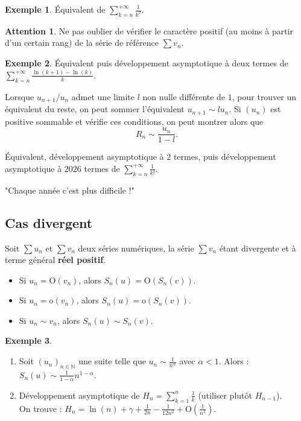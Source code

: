 \documentclass[french]{article}
\newcommand{\N}{\mathbb{N}}
\renewcommand{\o}{\text{o}}
\renewcommand{\O}{\text{O}}
\theoremstyle{plain}
\theoremstyle{definition}
\newtheorem*{ex}{Exemple}
\newtheorem*{attention}{Attention}
\theoremstyle{remark}
\begin{document}
\begin{ex}
	Équivalent de $\displaystyle\sum_{k=n}^{+\infty}\frac{1}{k^2}$.
\end{ex}

\begin{attention}
	Ne pas oublier de vérifier le caractère positif (au moins à partir d'un certain rang) de la série de référence $\displaystyle\sum v_n$.
\end{attention}

\begin{ex}
	Équivalent puis développement asymptotique à deux termes de $\displaystyle\sum_{k=n}^{+\infty}\frac{\ln(k+1)-\ln(k)}{k}$.
\end{ex}

\begin{met}
	Lorsque $u_{n+1}/u_n$ admet une limite $l$ non nulle différente de $1$, pour trouver un équivalent du reste, on peut sommer l'équivalent $u_{n+1}\sim lu_n$. Si $(u_n)$ est positive sommable et vérifie ces conditions, on peut montrer alors que $$R_n\sim\frac{u_n}{1-l}.$$
\end{met}

\begin{exo}
	Équivalent, développement asymptotique à $2$ termes, puis développement asymptotique à $2026$ termes de $\displaystyle\sum_{k=n}^{+\infty}\frac{1}{k!}$.
\end{exo}

"Chaque année c'est plus difficile !"

\subsection{Cas divergent}

\begin{thm}
	Soit $\displaystyle\sum u_n$ et $\displaystyle\sum v_n$ deux séries numériques, la série $\displaystyle \sum v_n$ étant divergente et à terme général \textbf{réel positif}.
	\begin{itemize}
		\item Si $u_n=\O(v_n)$, alors $S_n(u)=\O(S_n(v))$.
		\item Si $u_n=\o(v_n)$, alors $S_n(u)=\o(S_n(v))$.
		\item Si $u_n\sim v_n$, alors $S_n(u)\sim S_n(v)$.
	\end{itemize}
\end{thm}

\begin{ex}
	\begin{enumerate}
		\item Soit $(u_n)_{n\in\N}$ une suite telle que $u_n\sim\displaystyle\frac{1}{n^\alpha}$ avec $\alpha<1$. Alors : $S_n(u)\sim\displaystyle\frac{1}{1-\alpha}n^{1-\alpha}$.
		\item Développement asymptotique de $H_n=\displaystyle\sum_{k=1}^{n}\frac{1}{k}$ (utiliser plutôt $H_{n-1}$). \\
		On trouve : $H_n=\displaystyle\ln(n)+\gamma+\frac{1}{2n}-\frac{1}{12n^2}+\O\left(\frac{1}{n^3}\right)$.
	\end{enumerate}
\end{ex}
\end{document}

